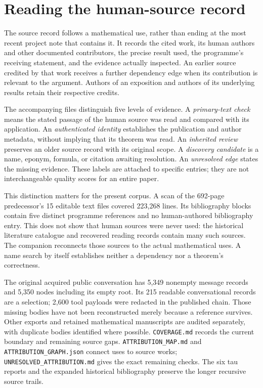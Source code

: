 \section{Reading the human-source record}
\label{app:provenance}
The source record follows a mathematical use, rather than ending at the most
recent project note that contains it. It records the cited work, its human
authors and other documented contributors, the precise result used, the
programme's receiving statement, and the evidence actually inspected. An
earlier source credited by that work receives a further dependency edge when
its contribution is relevant to the argument. Authors of an exposition and
authors of its underlying results retain their respective credits.

The accompanying files distinguish five levels of evidence. A
\emph{primary-text check} means the stated passage of the human source was
read and compared with its application. An \emph{authenticated identity}
establishes the publication and author metadata, without implying that its
theorem was read. An \emph{inherited review} preserves an older source record
with its original scope. A \emph{discovery candidate} is a name, eponym,
formula, or citation awaiting resolution. An \emph{unresolved edge} states
the missing evidence. These labels are attached to specific entries; they
are not interchangeable quality scores for an entire paper.

This distinction matters for the present corpus. A scan of the 692-page predecessor's
15 editable text files covered 223,268 lines. Its bibliography blocks contain
five distinct programme references and no human-authored bibliography entry.
This does not show that human sources were never used: the historical
literature catalogue and recovered reading records contain many such sources.
The companion reconnects those sources to the actual mathematical uses. A
name search by itself establishes neither a dependency nor a theorem's
correctness.

The original acquired public conversation has 5,349 nonempty message records
and 5,350 nodes including its empty root. Its 215 readable conversational
records are a selection; 2,600 tool payloads were redacted in the published
chain. Those missing bodies have not been reconstructed merely because a
reference survives. Other exports and retained mathematical manuscripts are
audited separately, with duplicate bodies identified where possible.
\texttt{COVERAGE.md} records the current boundary and remaining source gaps.
\texttt{ATTRIBUTION\_MAP.md} and \texttt{ATTRIBUTION\_GRAPH.json} connect
uses to source works; \texttt{UNRESOLVED\_ATTRIBUTION.md} gives the exact
remaining checks. The six tau reports and the expanded historical
bibliography preserve the longer recursive source trails.

